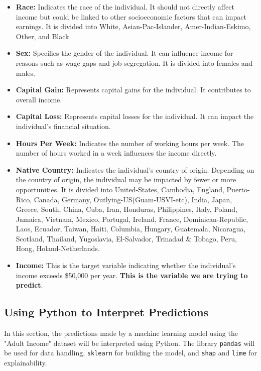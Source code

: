 \documentclass[10pt,journal,compsoc]{IEEEtran}
\begin{document}
\begin{itemize}
    \item \textbf{Race:} Indicates the race of the individual. It should not directly affect income but could be linked to other socioeconomic factors that can impact earnings. It is divided into White, Asian-Pac-Islander, Amer-Indian-Eskimo, Other, and Black.

    \item \textbf{Sex:} Specifies the gender of the individual. It can influence income for reasons such as wage gaps and job segregation. It is divided into females and males.

    \item \textbf{Capital Gain:} Represents capital gains for the individual. It contributes to overall income.

    \item \textbf{Capital Loss:} Represents capital losses for the individual. It can impact the individual's financial situation.

    \item \textbf{Hours Per Week:} Indicates the number of working hours per week. The number of hours worked in a week influences the income directly.

    \item \textbf{Native Country:} Indicates the individual's country of origin. Depending on the country of origin, the individual may be impacted by fewer or more opportunities. It is divided into United-States, Cambodia, England, Puerto-Rico, Canada, Germany, Outlying-US(Guam-USVI-etc), India, Japan, Greece, South, China, Cuba, Iran, Honduras, Philippines, Italy, Poland, Jamaica, Vietnam, Mexico, Portugal, Ireland, France, Dominican-Republic, Laos, Ecuador, Taiwan, Haiti, Columbia, Hungary, Guatemala, Nicaragua, Scotland, Thailand, Yugoslavia, El-Salvador, Trinadad \& Tobago, Peru, Hong, Holand-Netherlands.

    \item \textbf{Income:} This is the target variable indicating whether the individual's income exceeds  \$50,000 per year. \textbf{This is the variable we are trying to predict}.

\end{itemize}

\subsection{Using Python to Interpret Predictions}
In this section, the predictions made by a machine learning model using the "Adult Income" dataset will be interpreted using Python. The library \texttt{pandas} will be used for data handling, \texttt{sklearn} for building the model, and \texttt{shap} and \texttt{lime} for explainability.
\end{document}
